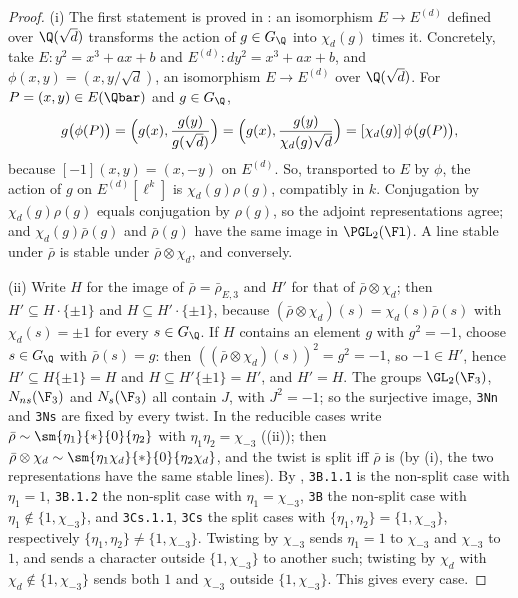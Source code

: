 \begin{proof}
(i) The first statement is proved in : an isomorphism $E\to E^{(d)}$ defined over $\Q(\sqrt d)$ transforms the action of
$g\in G_\Q$ into $\chi_d(g)$ times it. Concretely, take $E\colon y^2=x^3+ax+b$ and $E^{(d)}\colon dy^2=x^3+ax+b$, and $\phi(x,y)=(x,y/\sqrt d)$, an
isomorphism $E\to E^{(d)}$ over $\Q(\sqrt d)$. For $P=(x,y)\in E(\Qbar)$ and $g\in G_\Q$,
\[
g\bigl(\phi(P)\bigr)=\Bigl(g(x),\frac{g(y)}{g(\sqrt d)}\Bigr)=\Bigl(g(x),\frac{g(y)}{\chi_d(g)\sqrt d}\Bigr)=[\chi_d(g)]\,\phi\bigl(g(P)\bigr),
\]
because $[-1](x,y)=(x,-y)$ on $E^{(d)}$. So, transported to $E$ by $\phi$, the action of $g$ on $E^{(d)}[\ell^k]$ is $\chi_d(g)\rho(g)$, compatibly in $k$. Conjugation by $\chi_d(g)\rho(g)$ equals conjugation by $\rho(g)$, so the adjoint representations agree; and
$\chi_d(g)\bar\rho(g)$ and $\bar\rho(g)$ have the same image in $\PGL_2(\Fl)$. A line stable under $\bar\rho$ is stable under $\bar\rho\otimes\chi_d$, and conversely.

(ii) Write $H$ for the image of $\bar\rho=\bar\rho_{E,3}$ and $H'$ for that of $\bar\rho\otimes\chi_d$; then $H'\subseteq H\cdot\{\pm1\}$ and $H\subseteq H'\cdot\{\pm1\}$, because
$(\bar\rho\otimes\chi_d)(s)=\chi_d(s)\bar\rho(s)$ with $\chi_d(s)=\pm1$ for every $s\in G_\Q$.
If $H$ contains an element $g$ with $g^2=-1$, choose $s\in G_\Q$ with $\bar\rho(s)=g$: then $((\bar\rho\otimes\chi_d)(s))^2=g^2=-1$, so $-1\in H'$, hence
$H'\subseteq H\{\pm1\}=H$ and $H\subseteq H'\{\pm1\}=H'$, and $H'=H$. The groups $\GL_2(\F_3)$, $N_{ns}(\F_3)$ and $N_s(\F_3)$ all contain $J$, with $J^2=-1$; so
the surjective image, \texttt{3Nn} and \texttt{3Ns} are fixed by every twist. In the reducible cases write
$\bar\rho\sim\sm{\eta_1}{*}{0}{\eta_2}$ with $\eta_1\eta_2=\chi_{-3}$ ((ii)); then $\bar\rho\otimes\chi_d\sim\sm{\eta_1\chi_d}{*}{0}{\eta_2\chi_d}$,
and the twist is split iff $\bar\rho$ is (by (i), the two representations have the same stable lines). By , \texttt{3B.1.1} is the non-split case with $\eta_1=1$, \texttt{3B.1.2} the
non-split case with $\eta_1=\chi_{-3}$, \texttt{3B} the non-split case with $\eta_1\notin\{1,\chi_{-3}\}$, and \texttt{3Cs.1.1}, \texttt{3Cs} the split cases
with $\{\eta_1,\eta_2\}=\{1,\chi_{-3}\}$, respectively $\{\eta_1,\eta_2\}\ne\{1,\chi_{-3}\}$. Twisting by $\chi_{-3}$ sends $\eta_1=1$ to $\chi_{-3}$ and $\chi_{-3}$ to $1$,
and sends a character outside $\{1,\chi_{-3}\}$ to another such; twisting by $\chi_d$ with $\chi_d\notin\{1,\chi_{-3}\}$ sends both $1$ and $\chi_{-3}$ outside
$\{1,\chi_{-3}\}$. This gives every case.


\end{proof}
